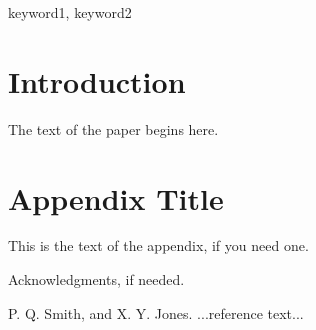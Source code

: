 \documentclass{sigplanconf}
\begin{document}
\keywords
keyword1, keyword2

\section{Introduction}

The text of the paper begins here.

\appendix
\section{Appendix Title}

This is the text of the appendix, if you need one.

\acks

Acknowledgments, if needed.





\begin{thebibliography}{}
\softraggedright

P. Q. Smith, and X. Y. Jones. ...reference text...

\end{thebibliography}
\end{document}
